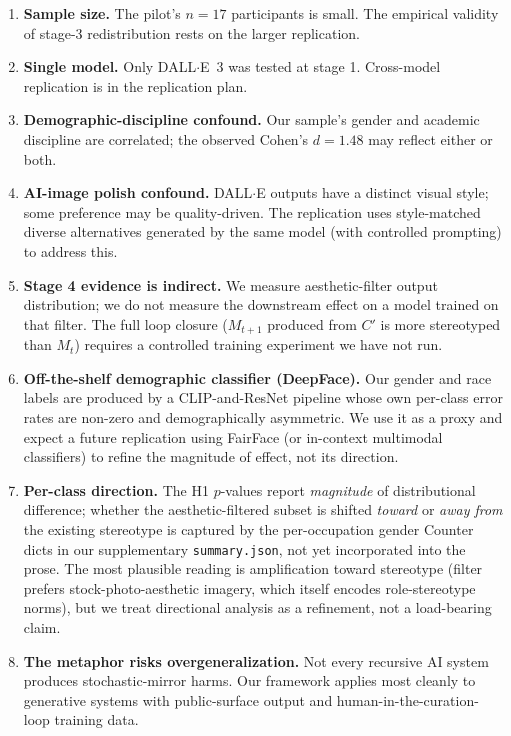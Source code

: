 \documentclass[sigconf,nonacm]{acmart}
\begin{document}
\begin{enumerate}
  \item \textbf{Sample size.} The pilot's \(n=17\) participants is small. The empirical validity of stage-3 redistribution rests on the larger replication.
  \item \textbf{Single model.} Only DALL$\cdot$E~3 was tested at stage 1. Cross-model replication is in the replication plan.
  \item \textbf{Demographic-discipline confound.} Our sample's gender and academic discipline are correlated; the observed Cohen's \(d = 1.48\) may reflect either or both.
  \item \textbf{AI-image polish confound.} DALL$\cdot$E outputs have a distinct visual style; some preference may be quality-driven. The replication uses style-matched diverse alternatives generated by the same model (with controlled prompting) to address this.
  \item \textbf{Stage 4 evidence is indirect.} We measure aesthetic-filter output distribution; we do not measure the downstream effect on a model trained on that filter. The full loop closure (\(M_{t+1}\) produced from \(C'\) is more stereotyped than \(M_t\)) requires a controlled training experiment we have not run.
  \item \textbf{Off-the-shelf demographic classifier (DeepFace).} Our gender and race labels are produced by a CLIP-and-ResNet pipeline whose own per-class error rates are non-zero and demographically asymmetric. We use it as a proxy and expect a future replication using FairFace (or in-context multimodal classifiers) to refine the magnitude of effect, not its direction.
  \item \textbf{Per-class direction.} The H1 \(p\)-values report \emph{magnitude} of distributional difference; whether the aesthetic-filtered subset is shifted \emph{toward} or \emph{away from} the existing stereotype is captured by the per-occupation gender Counter dicts in our supplementary \texttt{summary.json}, not yet incorporated into the prose. The most plausible reading is amplification toward stereotype (filter prefers stock-photo-aesthetic imagery, which itself encodes role-stereotype norms), but we treat directional analysis as a refinement, not a load-bearing claim.
  \item \textbf{The metaphor risks overgeneralization.} Not every recursive AI system produces stochastic-mirror harms. Our framework applies most cleanly to generative systems with public-surface output and human-in-the-curation-loop training data.
\end{enumerate}
\end{document}
